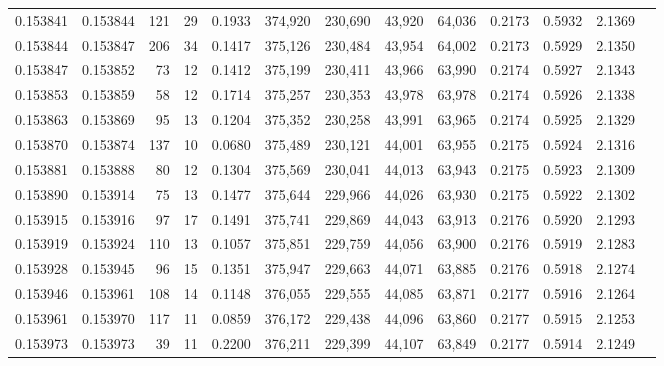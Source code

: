 \begin{tabular}{rrrrrrrrrrrrr}
0.153841 & 0.153844 &   121 &  29 &                                     0.1933 & 374,920 & 230,690 &  43,920 &  64,036 & 0.2173 & 0.5932 & 2.1369 \\
0.153844 & 0.153847 &   206 &  34 &                                     0.1417 & 375,126 & 230,484 &  43,954 &  64,002 & 0.2173 & 0.5929 & 2.1350 \\
0.153847 & 0.153852 &    73 &  12 &                                     0.1412 & 375,199 & 230,411 &  43,966 &  63,990 & 0.2174 & 0.5927 & 2.1343 \\
0.153853 & 0.153859 &    58 &  12 &                                     0.1714 & 375,257 & 230,353 &  43,978 &  63,978 & 0.2174 & 0.5926 & 2.1338 \\
0.153863 & 0.153869 &    95 &  13 &                                     0.1204 & 375,352 & 230,258 &  43,991 &  63,965 & 0.2174 & 0.5925 & 2.1329 \\
0.153870 & 0.153874 &   137 &  10 &                                     0.0680 & 375,489 & 230,121 &  44,001 &  63,955 & 0.2175 & 0.5924 & 2.1316 \\
0.153881 & 0.153888 &    80 &  12 &                                     0.1304 & 375,569 & 230,041 &  44,013 &  63,943 & 0.2175 & 0.5923 & 2.1309 \\
0.153890 & 0.153914 &    75 &  13 &                                     0.1477 & 375,644 & 229,966 &  44,026 &  63,930 & 0.2175 & 0.5922 & 2.1302 \\
0.153915 & 0.153916 &    97 &  17 &                                     0.1491 & 375,741 & 229,869 &  44,043 &  63,913 & 0.2176 & 0.5920 & 2.1293 \\
0.153919 & 0.153924 &   110 &  13 &                                     0.1057 & 375,851 & 229,759 &  44,056 &  63,900 & 0.2176 & 0.5919 & 2.1283 \\
0.153928 & 0.153945 &    96 &  15 &                                     0.1351 & 375,947 & 229,663 &  44,071 &  63,885 & 0.2176 & 0.5918 & 2.1274 \\
0.153946 & 0.153961 &   108 &  14 &                                     0.1148 & 376,055 & 229,555 &  44,085 &  63,871 & 0.2177 & 0.5916 & 2.1264 \\
0.153961 & 0.153970 &   117 &  11 &                                     0.0859 & 376,172 & 229,438 &  44,096 &  63,860 & 0.2177 & 0.5915 & 2.1253 \\
0.153973 & 0.153973 &    39 &  11 &                                     0.2200 & 376,211 & 229,399 &  44,107 &  63,849 & 0.2177 & 0.5914 & 2.1249 \\

\end{tabular}
